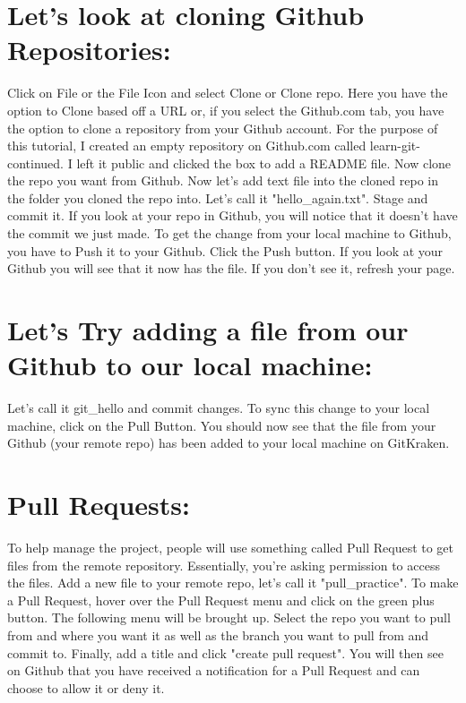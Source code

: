 \documentclass[10pt,twocolumn]{article}
\begin{document}
\section{Let's look at cloning Github Repositories:}

Click on File or the File Icon and select Clone or Clone repo. Here you have the option to Clone based off a URL or, if you select the Github.com tab, you have the option to clone a repository from your Github account. For the purpose of this tutorial, I created an empty repository on Github.com called learn-git-continued. I left it public and clicked the box to add a README file. Now clone the repo you want from Github. Now let's add text file into the cloned repo in the folder you cloned the repo into. Let's call it "hello\_again.txt". Stage and commit it. If you look at your repo in Github, you will notice that it doesn't have the commit we just made. To get the change from your local machine to Github, you have to Push it to your Github. Click the Push button. If you look at your Github you will see that it now has the file. If you don't see it, refresh your page.

\section{Let's Try adding a file from our Github to our local machine:}

Let's call it git\_hello and commit changes. To sync this change to your local machine, click on the Pull Button. You should now see that the file from your Github (your remote repo) has been added to your local machine on GitKraken.

\section{Pull Requests:}

To help manage the project, people will use something called Pull Request to get files from the remote repository. Essentially, you're asking permission to access the files. Add a new file to your remote repo, let's call it "pull\_practice". To make a Pull Request, hover over the Pull Request menu and click on the green plus button. The following menu will be brought up. Select the repo you want to pull from and where you want it as well as the branch you want to pull from and commit to. Finally, add a title and click "create pull request". You will then see on Github that you have received a notification for a Pull Request and can choose to allow it or deny it.

\printbibliography
\end{document}
